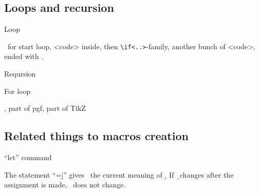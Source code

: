 \subsection{Loops and recursion}

\begin{frame}[fragile]{Loop \tW\magicPage}\relax
{}

\ccol\loop\ for start loop, <code> inside, then {\csk\verb|\if<..>|}-family, another bunch of <code>, ended with \ccol\repeat.

\end{frame}

\begin{frame}[fragile]{Reqursion \tW\magicPage}\relax
{}

\end{frame}


\begin{frame}[fragile]{For loop\lW\magicPage}\relax
{}
\ncol \usepackage{forloop}


\ncol \usepackage{pgffor}, part of pgf, part of TikZ

\end{frame}

\subsection{Related things to macros creation}

\begin{frame}[fragile]{``let'' command\magicPage}\relax



The statement ``\ccol\let\verb|\a=\b|'' gives \string\a\ the current meaning of \string\b. If \string\b\ changes after the assignment is made, \string\a\ does not change.

     
\end{frame}


